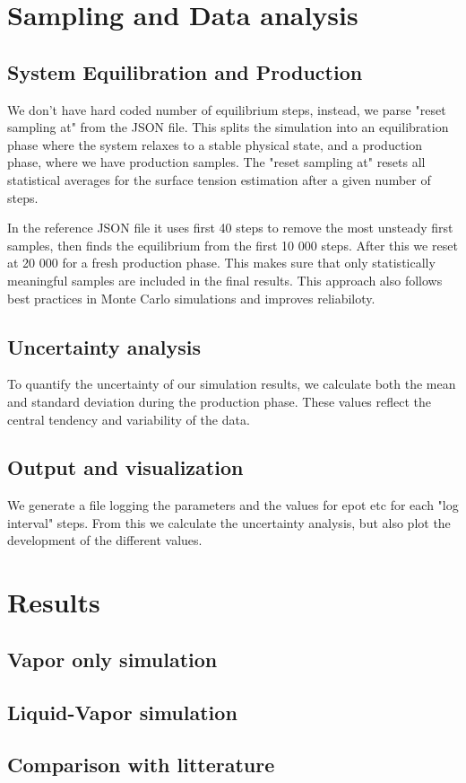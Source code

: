 \documentclass{article}
\begin{document}
\section*{Sampling and Data analysis}

\subsection*{System Equilibration and Production}

We don't have hard coded number of equilibrium steps, instead, we parse "reset sampling at" from the JSON file. This splits the simulation into an equilibration phase where the system relaxes to a stable physical state, and a production phase, where we have production samples. The "reset sampling at" resets all statistical averages for the surface tension estimation after a given number of steps.

In the reference JSON file it uses first 40 steps to remove the most unsteady first samples, then finds the equilibrium from the first 10 000 steps. After this we reset at 20 000 for a fresh production phase. This makes sure that only statistically meaningful samples are included in the final results. This approach also follows best practices in Monte Carlo simulations and improves reliabiloty.

\subsection*{Uncertainty analysis}

To quantify the uncertainty of our simulation results, we calculate both the mean and standard deviation during the production phase. These values reflect the central tendency and variability of the data.

\subsection*{Output and visualization}

We generate a file logging the parameters and the values for epot etc for each "log interval" steps. From this we calculate the uncertainty analysis, but also plot the development of the different values.

\section*{Results}

\subsection*{Vapor only simulation}

\subsection*{Liquid-Vapor simulation}

\subsection*{Comparison with litterature}





\end{document}

